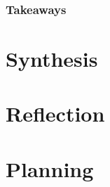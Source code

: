 \documentclass[
	letterpaper, %
]{jdf}
\begin{document}
\subsubsection{Takeaways}




\section{Synthesis}



\section{Reflection}


\section{Planning}


\printbibliography{}
\end{document}
